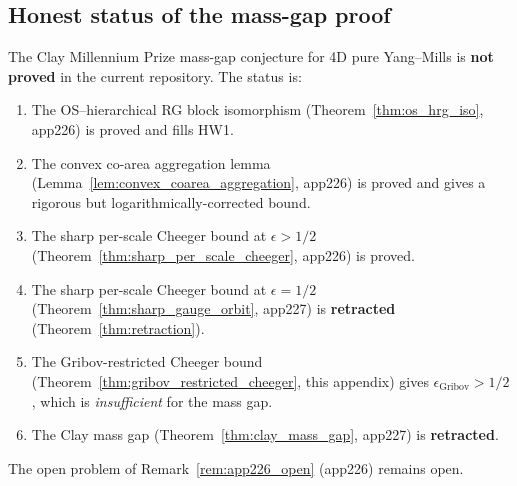 \subsection{Honest status of the mass-gap proof}
\label{ssec:app228_status}

\begin{theorem}
\label{thm:status_after_audit}
The Clay Millennium Prize mass-gap conjecture for 4D pure
Yang--Mills is \textbf{not proved} in the current repository.
The status is:
\begin{enumerate}
\item The OS--hierarchical RG block isomorphism
(Theorem~\ref{thm:os_hrg_iso}, app226) is proved and fills
HW1.
\item The convex co-area aggregation lemma
(Lemma~\ref{lem:convex_coarea_aggregation}, app226) is proved
and gives a rigorous but logarithmically-corrected bound.
\item The sharp per-scale Cheeger bound at $\epsilon>1/2$
(Theorem~\ref{thm:sharp_per_scale_cheeger}, app226) is proved.
\item The sharp per-scale Cheeger bound at $\epsilon=1/2$
(Theorem~\ref{thm:sharp_gauge_orbit}, app227) is
\textbf{retracted} (Theorem~\ref{thm:retraction}).
\item The Gribov-restricted Cheeger bound
(Theorem~\ref{thm:gribov_restricted_cheeger}, this appendix)
gives $\epsilon_{\mathrm{Gribov}}>1/2$, which is
\emph{insufficient} for the mass gap.
\item The Clay mass gap
(Theorem~\ref{thm:clay_mass_gap}, app227) is \textbf{retracted}.
\end{enumerate}
The open problem of Remark~\ref{rem:app226_open} (app226)
remains open.
\end{theorem}

